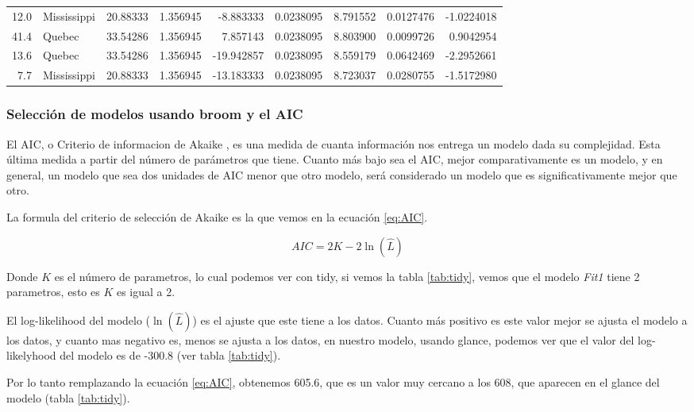 \documentclass[]{book}
\begin{document}
\begin{table}
\begin{tabular}[t]{rlrrrrrrr}
12.0 & Mississippi & 20.88333 & 1.356945 & -8.883333 & 0.0238095 & 8.791552 & 0.0127476 & -1.0224018\\
41.4 & Quebec & 33.54286 & 1.356945 & 7.857143 & 0.0238095 & 8.803900 & 0.0099726 & 0.9042954\\
13.6 & Quebec & 33.54286 & 1.356945 & -19.942857 & 0.0238095 & 8.559179 & 0.0642469 & -2.2952661\\
7.7 & Mississippi & 20.88333 & 1.356945 & -13.183333 & 0.0238095 & 8.723037 & 0.0280755 & -1.5172980\\
\bottomrule
\end{tabular}
\end{table}

\hypertarget{seleccion-de-modelos-usando-broom-y-el-aic}{%
\subsubsection{Selección de modelos usando broom y el
AIC}\label{seleccion-de-modelos-usando-broom-y-el-aic}}

El AIC, o Criterio de informacion de Akaike \citep{aho2014model}, es una
medida de cuanta información nos entrega un modelo dada su complejidad.
Esta última medida a partir del número de parámetros que tiene. Cuanto
más bajo sea el AIC, mejor comparativamente es un modelo, y en general,
un modelo que sea dos unidades de AIC menor que otro modelo, será
considerado un modelo que es significativamente mejor que otro.

La formula del criterio de selección de Akaike es la que vemos en la
ecuación \eqref{eq:AIC}.

\begin{equation} 
  AIC = 2 K - 2 \ln{(\hat{L})}
  \label{eq:AIC}
\end{equation}

Donde \(K\) es el número de parametros, lo cual podemos ver con tidy, si
vemos la tabla \ref{tab:tidy}, vemos que el modelo \emph{Fit1} tiene 2
parametros, esto es \(K\) es igual a 2.

El log-likelihood del modelo (\(\ln{(\hat{L})}\)) es el ajuste que este
tiene a los datos. Cuanto más positivo es este valor mejor se ajusta el
modelo a los datos, y cuanto mas negativo es, menos se ajusta a los
datos, en nuestro modelo, usando glance, podemos ver que el valor del
log-likelyhood del modelo es de -300.8 (ver tabla \ref{tab:tidy}).

Por lo tanto remplazando la ecuación \eqref{eq:AIC}, obtenemos 605.6, que
es un valor muy cercano a los 608, que aparecen en el glance del modelo
(tabla \ref{tab:tidy}).
\end{document}
